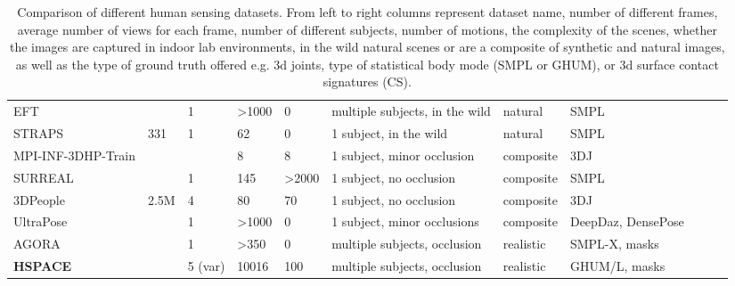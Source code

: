 \documentclass[10pt,twocolumn,letterpaper]{article}
\begin{document}
\begin{table*}[!htbp]
\begin{center}
{\begin{tabular}{lllllllllll}
EFT \cite{joo2020exemplar}               &          &       1   & \textgreater 1000 &    0        & multiple subjects, in the wild                    & natural    & SMPL                \\
STRAPS \cite{STRAPS2020BMVC}      &    331      &   1    & 62                &     0       & 1 subject, in the wild                            & natural    & SMPL                \\ \hline
MPI-INF-3DHP-Train \cite{mehta2017monocular} &           &             & 8                 &       8     & 1 subject, minor occlusion                        & composite & 3DJ  \\
SURREAL \cite{varol2017learning}           &          &       1   & 145               &      \textgreater{}2000      & 1 subject, no occlusion                           & composite & SMPL                \\
3DPeople \cite{pumarola20193dpeople}           &     2.5M     &   4  & 80                &      70      & 1 subject, no occlusion                           & composite & 3DJ  \\
UltraPose\cite{yan2021ultrapose}              &          &     1     & \textgreater{}1000 & 0 & 1 subject, minor occlusions & composite & DeepDaz, DensePose \\
AGORA\cite{Patel:CVPR:2021}              &          &  1        & \textgreater{}350 &      0      & multiple subjects, occlusion & realistic & SMPL-X, masks \\
\hline
\textbf{HSPACE}            &           &  5 (var)        &    10016               & 100            & multiple subjects, occlusion                                                  &  realistic          & GHUM/L, masks \\
\hline
\end{tabular}
}
\end{center}
\vspace{-5mm}
\caption{\small Comparison of different human sensing datasets. From left to right columns represent dataset name, number of different frames, average number of views for each frame, number of different subjects, number of motions, the complexity of the scenes, whether the images are captured in indoor lab environments, in the wild natural scenes or are a composite of synthetic and natural images, as well as the type of ground truth offered e.g. 3d joints, type of statistical body mode (SMPL or GHUM), or 3d surface contact signatures (CS).}
\label{tbl:datasets_comparison}
\end{table*}
\end{document}
